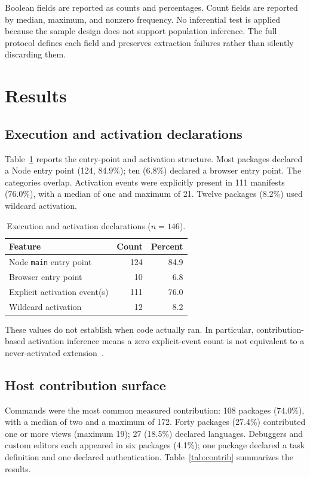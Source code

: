 \documentclass[10pt,twocolumn]{article}
\newcommand{\pct}[1]{#1\%}
\begin{document}
Boolean fields are reported as counts and percentages. Count fields are reported by median, maximum, and nonzero frequency. No inferential test is applied because the sample design does not support population inference. The full protocol defines each field and preserves extraction failures rather than silently discarding them.

\section{Results}
\subsection{Execution and activation declarations}
Table~\ref{tab:execution} reports the entry-point and activation structure. Most packages declared a Node entry point (124, \pct{84.9}); ten (\pct{6.8}) declared a browser entry point. The categories overlap. Activation events were explicitly present in 111 manifests (\pct{76.0}), with a median of one and maximum of 21. Twelve packages (\pct{8.2}) used wildcard activation.

\begin{table}[t]
\centering
\caption{Execution and activation declarations ($n=146$).}
\label{tab:execution}
\begin{tabular}{lrr}
\toprule
Feature & Count & Percent \\
\midrule
Node \texttt{main} entry point & 124 & 84.9 \\
Browser entry point & 10 & 6.8 \\
Explicit activation event(s) & 111 & 76.0 \\
Wildcard activation & 12 & 8.2 \\
\bottomrule
\end{tabular}
\end{table}

These values do not establish when code actually ran. In particular, contribution-based activation inference means a zero explicit-event count is not equivalent to a never-activated extension~\cite{vscode-activation}.

\subsection{Host contribution surface}
Commands were the most common measured contribution: 108 packages (\pct{74.0}), with a median of two and a maximum of 172. Forty packages (\pct{27.4}) contributed one or more views (maximum 19); 27 (\pct{18.5}) declared languages. Debuggers and custom editors each appeared in six packages (\pct{4.1}); one package declared a task definition and one declared authentication. Table~\ref{tab:contrib} summarizes the results.
\end{document}
